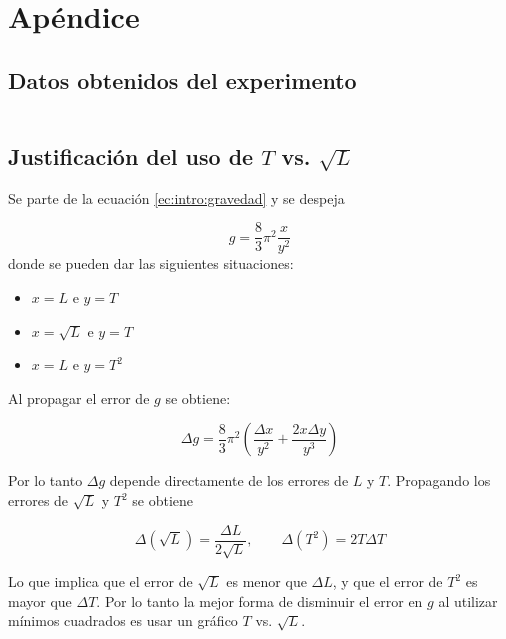 \section{Apéndice}
\label{sec:apendice}

\subsection{Datos obtenidos del experimento}

\begin{table}[H]
    \footnotesize
    \centering
    \begin{tabular}{r|rrrr}\toprule
        
    \end{tabular}
\end{table}

\subsection{Justificación del uso de $T$ vs. $\sqrt{L}$}
\label{sec:apendice:justificacion}

Se parte de la ecuación \ref{ec:intro:gravedad} y se despeja

\[
    g = \frac{8}{3}\pi^2 \frac{x}{y^2}
\]
donde se pueden dar las siguientes situaciones:

\begin{multicols}{3}
\begin{itemize}
    \item $x = L$ e $y = T$
    \item $x = \sqrt{L}$ e $y = T$
    \item $x = L$ e $y = T^2$
\end{itemize}
\end{multicols}

Al propagar el error de $g$ se obtiene:

\[
    \Delta g = \frac{8}{3}\pi^2 \left(
        \frac{\Delta x}{y^2} + 
        \frac{2x\Delta y}{y^3}
    \right)
\]

Por lo tanto $\Delta g$ depende directamente de los errores de $L$ y $T$.
Propagando los errores de $\sqrt{L}$ y $T^2$ se obtiene

\[
    \Delta \left(\sqrt{L}\right) = \frac{\Delta L}{2\sqrt{L}},
    \quad\quad
    \Delta \left( T^2 \right) = 2T\Delta T
\]

Lo que implica que el error de $\sqrt{L}$ es menor que $\Delta L$, y que 
el error de $T^2$ es mayor que $\Delta T$. Por lo tanto la mejor forma de 
disminuir el error en $g$ al utilizar mínimos cuadrados es usar un gráfico
$T$ vs. $\sqrt{L}$. 

